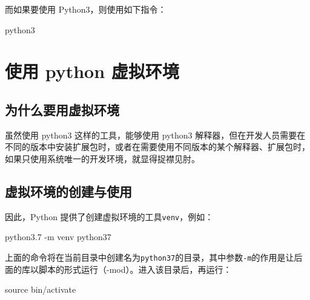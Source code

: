 \documentclass[]{ctexbook}
\newenvironment{Shaded}{\begin{snugshade}}{\end{snugshade}}
\newcommand{\BuiltInTok}[1]{#1}
\newcommand{\ExtensionTok}[1]{#1}
\newcommand{\NormalTok}[1]{#1}
\begin{document}
而如果要使用 Python3，则使用如下指令：

\begin{Shaded}
\begin{Highlighting}[]
\ExtensionTok{python3}
\end{Highlighting}
\end{Shaded}

\hypertarget{ux4f7fux7528-python-ux865aux62dfux73afux5883}{%
\section{使用 python 虚拟环境}\label{ux4f7fux7528-python-ux865aux62dfux73afux5883}}

\hypertarget{ux4e3aux4ec0ux4e48ux8981ux7528ux865aux62dfux73afux5883}{%
\subsection{为什么要用虚拟环境}\label{ux4e3aux4ec0ux4e48ux8981ux7528ux865aux62dfux73afux5883}}

虽然使用 python3 这样的工具，能够使用 python3 解释器，但在开发人员需要在不同的版本中安装扩展包时，或者在需要使用不同版本的某个解释器、扩展包时，如果只使用系统唯一的开发环境，就显得捉襟见肘。

\hypertarget{ux865aux62dfux73afux5883ux7684ux521bux5efaux4e0eux4f7fux7528}{%
\subsection{虚拟环境的创建与使用}\label{ux865aux62dfux73afux5883ux7684ux521bux5efaux4e0eux4f7fux7528}}

因此，Python 提供了创建虚拟环境的工具\texttt{venv}，例如：

\begin{Shaded}
\begin{Highlighting}[]
\ExtensionTok{python3.7}\NormalTok{ -m venv python37}
\end{Highlighting}
\end{Shaded}

上面的命令将在当前目录中创建名为\texttt{python37}的目录，其中参数\texttt{-m}的作用是让后面的库以脚本的形式运行（-mod）。进入该目录后，再运行：

\begin{Shaded}
\begin{Highlighting}[]
\BuiltInTok{source}\NormalTok{ bin/activate}
\end{Highlighting}
\end{Shaded}
\end{document}
